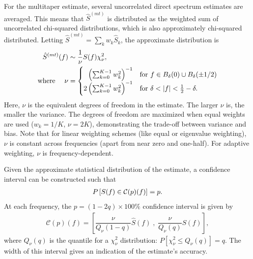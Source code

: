 For the multitaper estimate, several uncorrelated direct spectrum estimates are averaged.  This means that $\hat{S}^{(mt)}$ is distributed as the weighted sum of uncorrelated chi-squared distributions, which is also approximately chi-squared distributed.  Letting $\hat{S}^{(mt)}=\sum_k w_k\hat{S}_k$, the approximate distribution is
\begin{align}
    \hat{S}^{(mt)}(f) & \sim \frac{1}{\nu} S(f) \chi^2_\nu,\index{multitaper spectral estimator!distribution of}\\
\text{where }\quad \nu & = \begin{cases}
                        \phantom{2}\left(\sum_{k=0}^{K-1} w_k^2\right)^{-1} & \text{for }f \in B_\delta(0) \cup B_\delta(\pm1/2)\\
                        2\left(\sum_{k=0}^{K-1} w_k^2\right)^{-1} & \text{for } \delta < |f| < \tfrac{1}{2}-\delta.
                   \end{cases}  \label{eq:dof}\index{degrees of freedom}
\end{align}
Here, $\nu$ is the equivalent degrees of freedom in the estimate.  The larger $\nu$ is, the smaller the variance.  The degrees of freedom are maximized when equal weights are used ($w_k=1/K$, $\nu=2K$), demonstrating the trade-off between variance and bias.  Note that for linear weighting schemes (like equal or eigenvalue weighting), $\nu$ is constant across frequencies (apart from near zero and one-half).  For adaptive weighting, $\nu$ is frequency-dependent.

Given the approximate statistical distribution of the estimate, a confidence interval can be constructed such that
\begin{align*}
    P\left[S(f) \in \mathcal{C}(p)(f)\right]=p.\index{confidence interval}
\end{align*}
At each frequency, the $p=(1-2q)\times100\%$ confidence interval is given by
\begin{align}
    \mathcal{C}(p)(f)=\left[\dfrac{\nu}{Q_\nu(1-q)}\hat{S}(f)\;,\;\dfrac{\nu}{Q_\nu(q)}\hat{S}(f)\right],
\end{align}
where $Q_\nu(q)$ is the quantile for a $\chi^2_\nu$ distribution: $P\left[\chi^2_\nu\leq Q_\nu(q)\right]=q$.  The width of this interval gives an indication of the estimate's accuracy.

